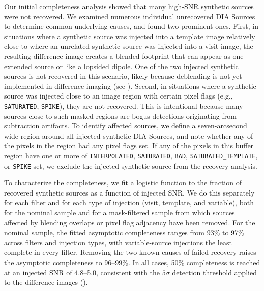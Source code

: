 Our initial completeness analysis showed that many high-\gls{SNR} synthetic sources were not recovered.
We examined numerous individual unrecovered \gls{DIA} Sources to determine common underlying causes, and found two prominent ones.
First, in situations where a synthetic source was injected into a template image relatively close to where an unrelated synthetic source was injected into a visit image, the resulting difference image creates a blended \gls{footprint} that can appear as one extended source or like a lopsided dipole.
One of the two injected synthetic sources is not recovered in this scenario, likely because deblending is not yet implemented in difference imaging (see ).
Second, in situations where a synthetic source was injected close to an image region with certain pixel flags (e.g., \texttt{SATURATED}, \texttt{SPIKE}), they are not recovered.
This is intentional because many sources close to such masked regions are bogus detections originating from subtraction artifacts.
To identify affected sources, we define a seven-arcsecond wide region around all injected synthetic \gls{DIA} Sources, and note whether any of the pixels in the region had any pixel flags set.
If any of the pixels in this buffer region have one or more of \texttt{INTERPOLATED}, \texttt{SATURATED}, \texttt{BAD}, \texttt{SATURATED\_TEMPLATE}, or \texttt{SPIKE} set, we exclude the injected synthetic source from the recovery analysis.

To characterize the completeness, we fit a logistic function to the fraction of recovered synthetic sources as a function of injected \gls{SNR}.
%
We do this separately for each filter and for each type of injection (visit, template, and variable), both for the nominal sample and for a mask-filtered sample from which sources affected by blending overlaps or pixel flag adjacency have been removed.
%
For the nominal sample, the fitted asymptotic completeness ranges from 93\% to 97\% across filters and injection types, with variable-source injections the least complete in every filter.
%
Removing the two known causes of failed recovery raises the asymptotic completeness to 96--99\%.
%
In all cases, 50\% completeness is reached at an injected \gls{SNR} of 4.8--5.0, consistent with the $5\sigma$ detection threshold applied to the difference images ().

